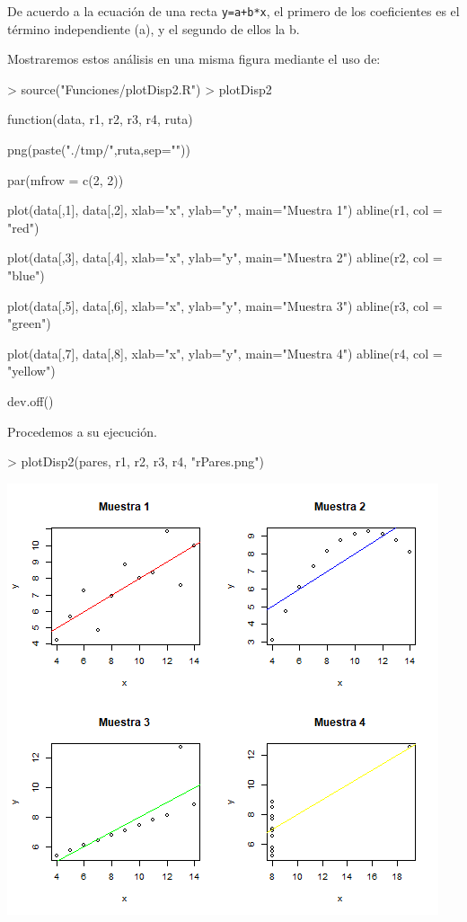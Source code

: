 \documentclass [a4paper] {article}
\begin{document}
\bigskip
De acuerdo a la ecuación de una recta \texttt{y=a+b*x}, el primero de los coeficientes es el término independiente (a), y el segundo
de ellos la b.

\bigskip
Mostraremos estos análisis en una misma figura mediante el uso de:
\begin{Schunk}
\begin{Sinput}
> source("Funciones/plotDisp2.R")
> plotDisp2
\end{Sinput}
\begin{Soutput}
function(data, r1, r2, r3, r4, ruta) {

    png(paste("./tmp/",ruta,sep=""))

    par(mfrow = c(2, 2))

    plot(data[,1], data[,2], xlab="x", ylab="y", main="Muestra 1")
    abline(r1, col = "red")

    plot(data[,3], data[,4], xlab="x", ylab="y", main="Muestra 2")
    abline(r2, col = "blue")

    plot(data[,5], data[,6], xlab="x", ylab="y", main="Muestra 3")
    abline(r3, col = "green")

    plot(data[,7], data[,8], xlab="x", ylab="y", main="Muestra 4")
    abline(r4, col = "yellow")

    dev.off()
}
\end{Soutput}
\end{Schunk}

\bigskip
Procedemos a su ejecución.
\begin{Schunk}
\begin{Sinput}
> plotDisp2(pares, r1, r2, r3, r4, "rPares.png")
\end{Sinput}
\end{Schunk}
\includegraphics[width=\textwidth]{rPares}
\end{document}
